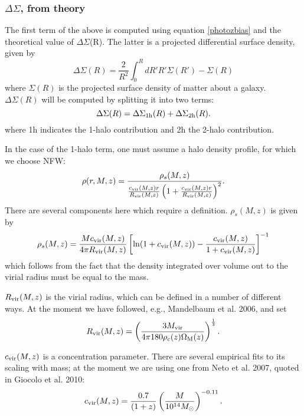 \documentclass[onecolumn,amsmath,aps,fleqn, superscriptaddress]{revtex4}
\begin{document}
\subsubsection{$\Delta \Sigma$, from theory}
The first term of the above is computed using equation \ref{photozbias} and the theoretical value of $\Delta \Sigma$(R). The latter is a projected differential surface density, given by
\begin{equation}
\Delta \Sigma(R) = \frac{2}{R^2} \int_0^R dR' R' \Sigma(R') - \Sigma(R)
\label{DelSigDef}
\end{equation}
where $\Sigma(R)$ is the projected surface density of matter about a galaxy. $\Delta \Sigma(R)$ will be computed by splitting it into two terms:
\begin{equation}
\Delta\Sigma(R) = \Delta\Sigma_{{\rm 1h}}(R) + \Delta \Sigma_{{\rm 2h}}(R).
\label{DeltaSigterm}
\end{equation}
where 1h indicates the 1-halo contribution and 2h the 2-halo contribution.

In the case of the 1-halo term, one must assume a halo density profile, for which we choose NFW:
\begin{equation}
\rho(r, M, z) = \frac{\rho_s(M,z)}{\frac{c_{\rm vir}(M,z)r}{R_{\rm vir}(M,z)}\left(1+\frac{c_{\rm vir}(M,z)r}{R_{\rm vir}(M,z)}\right)^2}.
\label{nfw}
\end{equation}
There are several components here which require a definition. $\rho_s(M,z)$ is given by
\begin{equation}
\rho_s(M,z) = \frac{Mc_{\rm vir}(M,z)}{4 \pi R_{\rm vir}(M,z)}\left[{\rm ln} (1+ c_{\rm vir}(M,z)) - \frac{c_{\rm vir}(M,z)}{1+c_{\rm vir}(M,z)}\right]^{-1}
\label{rhos}
\end{equation}
which follows from the fact that the density integrated over volume out to the virial radius must be equal to the  mass.

$R_{\rm vir}(M,z)$ is the virial radius, which can be defined in a number of different ways. At the moment we have followed, e.g., Mandelbaum et al. 2006, and set
\begin{equation}
R_{\rm vir}(M,z) = \left(\frac{3 M_{\rm vir}}{4 \pi 180 \rho_c(z) \Omega_{\rm M}(z)} \right)^{\frac{1}{3}}.
\label{Rvir}
\end{equation}

$c_{\rm vir}(M,z)$ is a concentration parameter. There are several empirical fits to its scaling with mass; at the moment we are using one from Neto et al. 2007, quoted in Giocolo et al. 2010:
\begin{equation}
c_{\rm vir}(M,z) = \frac{0.7}{(1+z)}\left(\frac{M}{10^{14}M_{\odot}}\right)^{-0.11}.
\label{cvir}
\end{equation}
\end{document}
